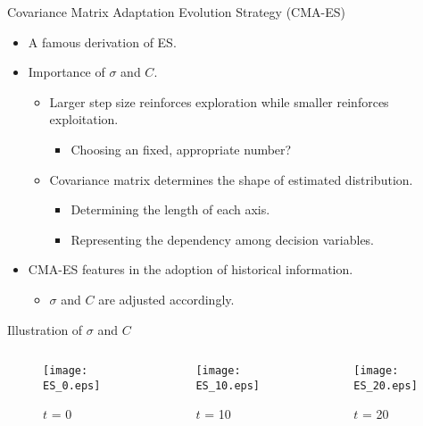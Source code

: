\begin{frame}{Covariance Matrix Adaptation Evolution Strategy (CMA-ES)}
  \begin{itemize}
    \item A famous derivation of ES.
      \vspace*{14pt}
    \item Importance of $\sigma$ and $C$.
      \begin{itemize}
        \item Larger step size reinforces exploration while smaller
          reinforces exploitation.
          \begin{itemize}
            \item Choosing an fixed, appropriate number?
          \end{itemize}
        \item Covariance matrix determines the shape of estimated
          distribution.
          \begin{itemize}
            \item Determining the length of each axis.
            \item Representing the dependency among decision variables.
          \end{itemize}
      \end{itemize}
      \vspace*{14pt}
    \item CMA-ES features in the adoption of historical information.
      \begin{itemize}
        \item $\sigma$ and $C$ are adjusted accordingly.
      \end{itemize}
  \end{itemize}
\end{frame}

\begin{frame}{Illustration of $\sigma$ and $C$}
  \begin{columns}
    \begin{column}{.33\textwidth}
      \begin{figure}
        \centering
        \texttt{[image: ES\_0.eps]}
        \caption{$t$ = 0}
      \end{figure}
    \end{column}
    \begin{column}{.33\textwidth}
      \begin{figure}
        \centering
        \texttt{[image: ES\_10.eps]}
        \caption{$t$ = 10}
      \end{figure}
    \end{column}
    \begin{column}{.33\textwidth}
      \begin{figure}
        \centering
        \texttt{[image: ES\_20.eps]}
        \caption{$t$ = 20}
      \end{figure}
    \end{column}
  \end{columns}
\end{frame}

